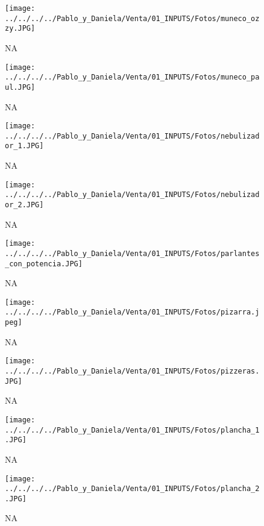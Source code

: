 \documentclass[
]{article}
\begin{document}
\pagebreak

\begin{figure}
\centering
\texttt{[image: ../../../../Pablo\_y\_Daniela/Venta/01\_INPUTS/Fotos/muneco\_ozzy.JPG]}
\caption{NA}
\end{figure}

\pagebreak

\begin{figure}
\centering
\texttt{[image: ../../../../Pablo\_y\_Daniela/Venta/01\_INPUTS/Fotos/muneco\_paul.JPG]}
\caption{NA}
\end{figure}

\pagebreak

\begin{figure}
\centering
\texttt{[image: ../../../../Pablo\_y\_Daniela/Venta/01\_INPUTS/Fotos/nebulizador\_1.JPG]}
\caption{NA}
\end{figure}

\pagebreak

\begin{figure}
\centering
\texttt{[image: ../../../../Pablo\_y\_Daniela/Venta/01\_INPUTS/Fotos/nebulizador\_2.JPG]}
\caption{NA}
\end{figure}

\pagebreak

\begin{figure}
\centering
\texttt{[image: ../../../../Pablo\_y\_Daniela/Venta/01\_INPUTS/Fotos/parlantes\_con\_potencia.JPG]}
\caption{NA}
\end{figure}

\pagebreak

\begin{figure}
\centering
\texttt{[image: ../../../../Pablo\_y\_Daniela/Venta/01\_INPUTS/Fotos/pizarra.jpeg]}
\caption{NA}
\end{figure}

\pagebreak

\begin{figure}
\centering
\texttt{[image: ../../../../Pablo\_y\_Daniela/Venta/01\_INPUTS/Fotos/pizzeras.JPG]}
\caption{NA}
\end{figure}

\pagebreak

\begin{figure}
\centering
\texttt{[image: ../../../../Pablo\_y\_Daniela/Venta/01\_INPUTS/Fotos/plancha\_1.JPG]}
\caption{NA}
\end{figure}

\pagebreak

\begin{figure}
\centering
\texttt{[image: ../../../../Pablo\_y\_Daniela/Venta/01\_INPUTS/Fotos/plancha\_2.JPG]}
\caption{NA}
\end{figure}
\end{document}
